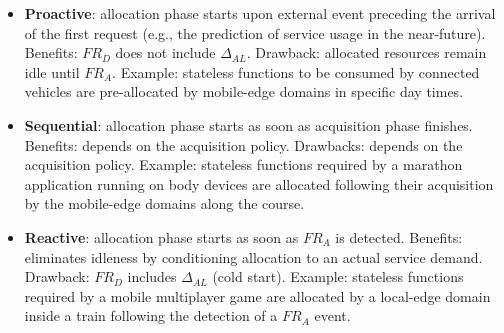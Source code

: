 \begin{itemize}

\item \textbf{Proactive}: allocation phase starts upon external event preceding the arrival of the first request (e.g., the prediction of service usage in the near-future). Benefits: $FR_D$ does not include $\Delta_{AL}$. Drawback: allocated resources remain idle until $FR_A$. Example: stateless functions to be consumed by connected vehicles are pre-allocated by mobile-edge domains in specific day times.

\item \textbf{Sequential}: allocation phase starts as soon as acquisition phase finishes. Benefits: depends on the acquisition policy. Drawbacks: depends on the acquisition policy. Example: stateless functions required by a marathon application running on body devices are allocated following their acquisition by the mobile-edge domains along the course.

\item \textbf{Reactive}: allocation phase starts as soon as $FR_A$ is detected. Benefits: eliminates idleness by conditioning allocation to an actual service demand. Drawback: $FR_D$ includes $\Delta_{AL}$ (cold start). Example: stateless functions required by a mobile multiplayer game are allocated by a local-edge domain inside a train following the detection of a $FR_A$ event.

\end{itemize}

